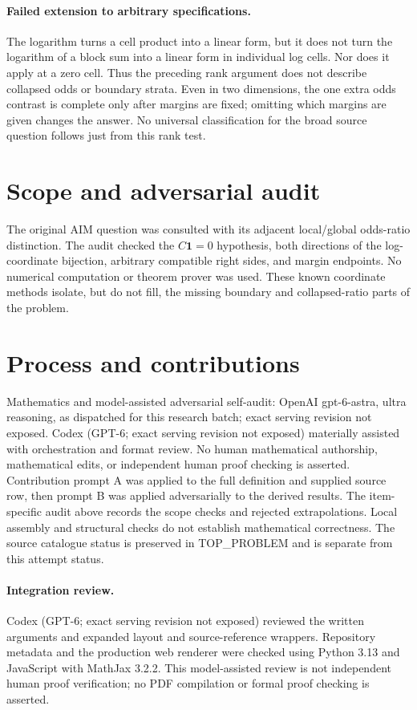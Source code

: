 \documentclass[11pt]{article}
\begin{document}
\paragraph{Failed extension to arbitrary specifications.}
The logarithm turns a cell product into a linear form, but it does not turn
the logarithm of a block sum into a linear form in individual log cells.
Nor does it apply at a zero cell. Thus the preceding rank argument does
not describe collapsed odds or boundary strata. Even in two dimensions,
the one extra odds contrast is complete only after margins are fixed;
omitting which margins are given changes the answer. No universal
classification for the broad source question follows just from this rank test.

\section{Scope and adversarial audit}
The original AIM question was consulted with its adjacent local/global
odds-ratio distinction. The audit checked the $C\boldsymbol1=0$ hypothesis,
both directions of the log-coordinate bijection, arbitrary compatible
right sides, and margin endpoints. No numerical computation or theorem
prover was used. These known coordinate methods isolate, but do not fill,
the missing boundary and collapsed-ratio parts of the problem.

\section{Process and contributions}
Mathematics and model-assisted adversarial self-audit: OpenAI gpt-6-astra, ultra reasoning, as dispatched for this research batch; exact serving revision not exposed. Codex (GPT-6; exact serving revision not exposed) materially assisted with orchestration and format review. No human mathematical authorship, mathematical edits, or independent human proof checking is asserted.
Contribution prompt A was applied to the full definition and supplied source row, then prompt B was applied adversarially to the derived results. The item-specific audit above records the scope checks and rejected extrapolations. Local assembly and structural checks do not establish mathematical correctness. The source catalogue status is preserved in TOP\_PROBLEM and is separate from this attempt status.
\paragraph{Integration review.} Codex (GPT-6; exact serving revision not exposed) reviewed the written arguments and expanded layout and source-reference wrappers. Repository metadata and the production web renderer were checked using Python 3.13 and JavaScript with MathJax 3.2.2. This model-assisted review is not independent human proof verification; no PDF compilation or formal proof checking is asserted.
\end{document}
